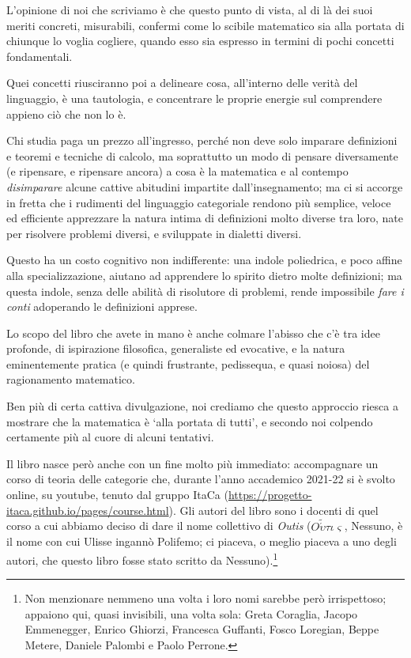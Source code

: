 \begin{itemize}
\end{itemize}
L'opinione di noi che scriviamo è che questo punto di vista, al di là dei suoi meriti concreti, misurabili, confermi come lo scibile matematico sia alla portata di chiunque lo voglia cogliere, quando esso sia espresso in termini di pochi concetti fondamentali.

Quei concetti riusciranno poi a delineare cosa, all'interno delle verità del linguaggio, è una tautologia, e concentrare le proprie energie sul comprendere appieno ciò che non lo è. 

Chi studia paga un prezzo all'ingresso, perché non deve solo imparare definizioni e teoremi e tecniche di calcolo, ma soprattutto un modo di pensare diversamente (e ripensare, e ripensare ancora) a cosa è la matematica e al contempo \emph{disimparare} alcune cattive abitudini impartite dall'insegnamento; ma ci si accorge in fretta che i rudimenti del linguaggio categoriale rendono più semplice, veloce ed efficiente apprezzare la natura intima di definizioni molto diverse tra loro, nate per risolvere problemi diversi, e sviluppate in dialetti diversi.

Questo ha un costo cognitivo non indifferente: una indole poliedrica, e poco affine alla specializzazione, aiutano ad apprendere lo spirito dietro molte definizioni; ma questa indole, senza delle abilità di risolutore di problemi, rende impossibile \emph{fare i conti} adoperando le definizioni apprese.

\medskip
Lo scopo del libro che avete in mano è anche colmare l'abisso che c'è tra idee profonde, di ispirazione filosofica, generaliste ed evocative, e la natura eminentemente pratica (e quindi frustrante, pedissequa, e quasi noiosa) del ragionamento matematico.

Ben più di certa cattiva divulgazione, noi crediamo che questo approccio riesca a mostrare che la matematica è `alla portata di tutti', e secondo noi colpendo certamente più al cuore di alcuni tentativi.

\medskip
Il libro nasce però anche con un fine molto più immediato: accompagnare un corso di teoria delle categorie che, durante l'anno accademico 2021-22 si è svolto online, su youtube, tenuto dal gruppo ItaCa (\url{https://progetto-itaca.github.io/pages/course.html}). Gli autori del libro sono i docenti di quel corso a cui abbiamo deciso di dare il nome collettivo di \emph{Outis} (\(O\tilde{\acute\upsilon}\tau\iota\varsigma\), Nessuno, è il nome con cui Ulisse ingannò Polifemo; ci piaceva, o meglio piaceva a uno degli autori, che questo libro fosse stato scritto da Nessuno).\footnote{Non menzionare nemmeno una volta i loro nomi sarebbe però irrispettoso; appaiono qui, quasi invisibili, una volta sola:
	Greta Coraglia, Jacopo Emmenegger, Enrico Ghiorzi, Francesca Guffanti, Fosco Loregian, Beppe Metere, Daniele Palombi e Paolo Perrone.}

